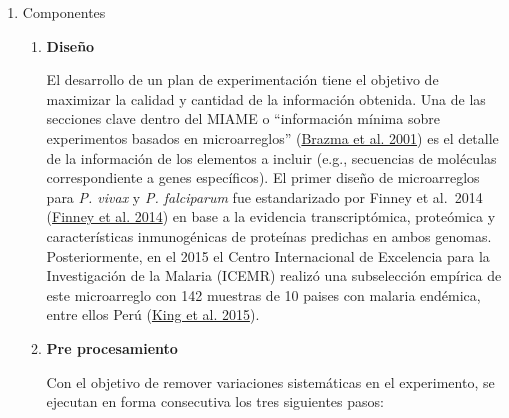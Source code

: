 \documentclass[
  a4paper]{article}
\begin{document}
\begin{enumerate}
\def\labelenumi{\alph{enumi}.}
\item
  Componentes

  \begin{enumerate}
  \def\labelenumii{\roman{enumii}.}
  \item
    \textbf{Diseño}

    El desarrollo de un plan de experimentación tiene el objetivo de
    maximizar la calidad y cantidad de la información obtenida. Una de
    las secciones clave dentro del MIAME o ``información mínima sobre
    experimentos basados en microarreglos''
    (\protect\hyperlink{ref-brazma2001}{Brazma et al. 2001}) es el
    detalle de la información de los elementos a incluir (e.g.,
    secuencias de moléculas correspondiente a genes específicos). El
    primer diseño de microarreglos para \emph{P. vivax} y \emph{P.
    falciparum} fue estandarizado por Finney et al.~2014
    (\protect\hyperlink{ref-Finney2014}{Finney et al. 2014}) en base a
    la evidencia transcriptómica, proteómica y características
    inmunogénicas de proteínas predichas en ambos genomas.
    Posteriormente, en el 2015 el Centro Internacional de Excelencia
    para la Investigación de la Malaria (ICEMR) realizó una subselección
    empírica de este microarreglo con 142 muestras de 10 paises con
    malaria endémica, entre ellos Perú
    (\protect\hyperlink{ref-King2015FOC}{King et al. 2015}).
  \item
    \textbf{Pre procesamiento}

    Con el objetivo de remover variaciones sistemáticas en el
    experimento, se ejecutan en forma consecutiva los tres siguientes
    pasos:


\end{enumerate}
\end{enumerate}
\end{document}
